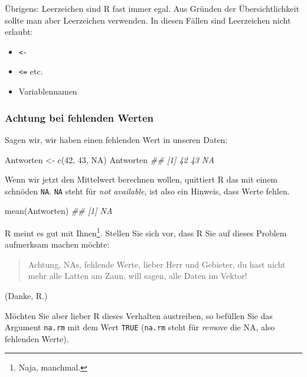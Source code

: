 \documentclass[
  a4paper,
]{scrbook}
\newenvironment{Shaded}{\begin{snugshade}}{\end{snugshade}}
\newcommand{\ConstantTok}[1]{\textcolor[rgb]{0.56,0.35,0.01}{#1}}
\newcommand{\DecValTok}[1]{\textcolor[rgb]{0.68,0.00,0.00}{#1}}
\newcommand{\DocumentationTok}[1]{\textcolor[rgb]{0.37,0.37,0.37}{\textit{#1}}}
\newcommand{\FunctionTok}[1]{\textcolor[rgb]{0.28,0.35,0.67}{#1}}
\newcommand{\NormalTok}[1]{\textcolor[rgb]{0.00,0.23,0.31}{#1}}
\newcommand{\OtherTok}[1]{\textcolor[rgb]{0.00,0.23,0.31}{#1}}
\providecommand{\tightlist}{%
  \setlength{\itemsep}{0pt}\setlength{\parskip}{0pt}}\usepackage{longtable,booktabs,array}
\theoremstyle{definition}
\theoremstyle{definition}
\theoremstyle{definition}
\theoremstyle{remark}
\begin{document}
Übrigens: Leerzeichen sind R fast immer egal. Aus Gründen der
Übersichtlichkeit sollte man aber Leerzeichen verwenden. In diesen
Fällen sind Leerzeichen nicht erlaubt:

\begin{itemize}
\tightlist
\item
  \texttt{\textless{}-}
\item
  \texttt{\textless{}=} etc.
\item
  Variablennamen
\end{itemize}

\subsubsection{Achtung bei fehlenden
Werten}\label{achtung-bei-fehlenden-werten}

Sagen wir, wir haben einen fehlenden Wert in unseren Daten:

\begin{Shaded}
\begin{Highlighting}[]
\NormalTok{Antworten }\OtherTok{\textless{}{-}} \FunctionTok{c}\NormalTok{(}\DecValTok{42}\NormalTok{, }\DecValTok{43}\NormalTok{, }\ConstantTok{NA}\NormalTok{)}
\NormalTok{Antworten}
\DocumentationTok{\#\# [1] 42 43 NA}
\end{Highlighting}
\end{Shaded}

Wenn wir jetzt den Mittelwert berechnen wollen, quittiert R das mit
einem schnöden \texttt{NA}. \texttt{NA} steht für \emph{not available},
ist also ein Hinweis, dass Werte fehlen.

\begin{Shaded}
\begin{Highlighting}[]
\FunctionTok{mean}\NormalTok{(Antworten)}
\DocumentationTok{\#\# [1] NA}
\end{Highlighting}
\end{Shaded}

R meint es gut mit Ihnen\footnote{{} Naja, manchmal.}.
Stellen Sie sich vor, dass R Sie auf dieses Problem aufmerksam machen
möchte:

\begin{quote}
{} Achtung, NAs, fehlende Werte, lieber Herr und Gebieter,
du hast nicht mehr alle Latten am Zaun, will sagen, alle Daten im
Vektor!
\end{quote}

(Danke, R.)

Möchten Sie aber lieber R dieses Verhalten austreiben, so befüllen Sie
das Argument \texttt{na.rm} mit dem Wert \texttt{TRUE} (\texttt{na.rm}
steht für \emph{r}e\emph{m}ove die NA, also fehlenden Werte).
\end{document}
